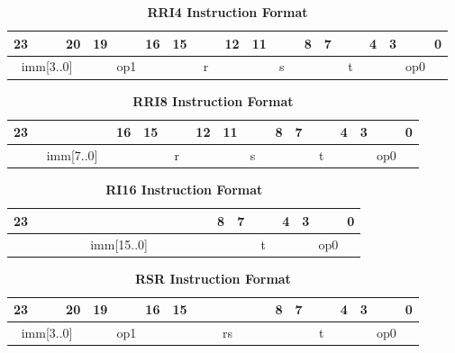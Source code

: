 \begin{table}[H]
	\caption{\textbf{RRI4 Instruction Format}}
	\begin{tabular}{llllllllllllllllllllllll}
		23 & & & 20 & 19 & & & 16 & 15 & & & 12 & 11 & & & 8 & 7 & & & 4 & 3 & & & 0 \\
		\hline
		\multicolumn{4}{|c|}{imm[3..0]} & \multicolumn{4}{c|}{op1} & \multicolumn{4}{c|}{r} & \multicolumn{4}{c|}{s} & \multicolumn{4}{c|}{t} & \multicolumn{4}{c|}{op0}\\
		\hline
	\end{tabular}
\end{table}

\begin{table}[H]
	\caption{\textbf{RRI8 Instruction Format}}
	\begin{tabular}{llllllllllllllllllllllll}
		23 & & & & & & & 16 & 15 & & & 12 & 11 & & & 8 & 7 & & & 4 & 3 & & & 0 \\
		\hline
		\multicolumn{8}{|c|}{imm[7..0]} & \multicolumn{4}{c|}{r} & \multicolumn{4}{c|}{s} & \multicolumn{4}{c|}{t} & \multicolumn{4}{c|}{op0}\\
		\hline
	\end{tabular}
\end{table}

\begin{table}[H]
	\caption{\textbf{RI16 Instruction Format}}
	\begin{tabular}{llllllllllllllllllllllll}
		23 & & & & & & & & & & & & & & & 8 & 7 & & & 4 & 3 & & & 0 \\
		\hline
		\multicolumn{16}{|c|}{imm[15..0]} & \multicolumn{4}{c|}{t} & \multicolumn{4}{c|}{op0}\\
		\hline
	\end{tabular}
\end{table}

\begin{table}[H]
	\caption{\textbf{RSR Instruction Format}}
	\begin{tabular}{llllllllllllllllllllllll}
		23 & & & 20 & 19 & & & 16 & 15 & & & & & & & 8 & 7 & & & 4 & 3 & & & 0 \\
		\hline
		\multicolumn{4}{|c|}{imm[3..0]} & \multicolumn{4}{c|}{op1} &\multicolumn{8}{c|}{rs} & \multicolumn{4}{c|}{t} & \multicolumn{4}{c|}{op0}\\
		\hline
	\end{tabular}
\end{table}

